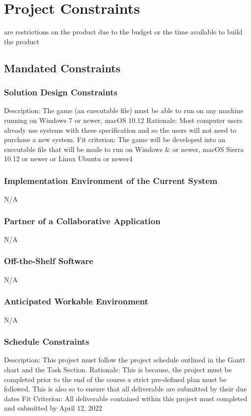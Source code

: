 \documentclass{article}
\begin{document}
\section{Project Constraints}
are restrictions on the product due to the budget or the 
time available to build the product
    \subsection{Mandated Constraints}
    
    \subsubsection{Solution Design Constraints}
    Description: The game (an executable file) must be able to run on any machine running on Windows 7 or newer, macOS 10.12 
    Rationale: Most computer users already use systems with these specification and so the users will not need to purchase a new system.
    Fit criterion: The game will be developed into an executable file that will be made to run on Windows & or newer, macOS Sierra 10.12 or newer or Linux Ubuntu or newer4
\subsubsection{Implementation Environment of the Current System}
N/A
\subsubsection{Partner of a Collaborative Application}
N/A
\subsubsection{Off-the-Shelf Software}
N/A
\subsubsection{Anticipated Workable Environment}
N/A
\subsubsection{Schedule Constraints}
Description: This project must follow the project schedule outlined in the Gantt chart and the Task Section.
Rationale: This is because, the project must be completed prior to the end of the course a strict pre-defined plan must be followed. This is also so to ensure that all deliverable are submitted by their due dates
Fit Criterion: All deliverable contained within this project must completed and submitted by April 12, 2022 
\end{document}
